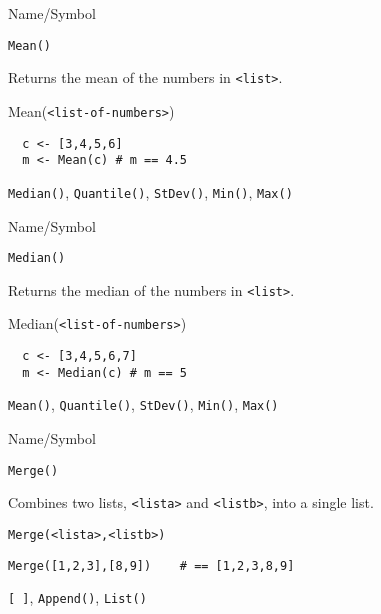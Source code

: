 \rl





\begin{desc}{Name/Symbol}
\item[Name/Symbol]	\verb+Mean()+

\item[Description] 	Returns the mean of the numbers in \verb+<list>+.

\item[Usage]	Mean(\verb+<list-of-numbers>+)	

\item[Example]	
\begin{verbatim} 
  c <- [3,4,5,6]
  m <- Mean(c) # m == 4.5
\end{verbatim}

\item[See Also]	\verb+Median()+, \verb+Quantile()+, \verb+StDev()+, \verb+Min()+, \verb+Max()+
\end{desc}

\rl



\begin{desc}{Name/Symbol}
\item[Name/Symbol]	\verb+Median()+

\item[Description]	Returns the median of the numbers in
  \verb+<list>+.  

\item[Usage]	Median(\verb+<list-of-numbers>+)

\item[Example]	
\begin{verbatim} 
  c <- [3,4,5,6,7]
  m <- Median(c) # m == 5
\end{verbatim}
\item[See Also]	\verb+Mean()+, \verb+Quantile()+, \verb+StDev()+, \verb+Min()+, \verb+Max()+
\end{desc}

\rl


\begin{desc}{Name/Symbol}
\item[Name/Symbol]	\verb+Merge()+

\item[Description]	Combines two lists, \verb+<lista>+ and \verb+<listb>+, into a single list.

\item[Usage]		
\begin{verbatim}
Merge(<lista>,<listb>)
\end{verbatim}

\item[Example]	
\begin{verbatim}
Merge([1,2,3],[8,9]) 	# == [1,2,3,8,9]
\end{verbatim}

\item[See Also]	\verb+[ ]+, \verb+Append()+, \verb+List()+
\end{desc}

